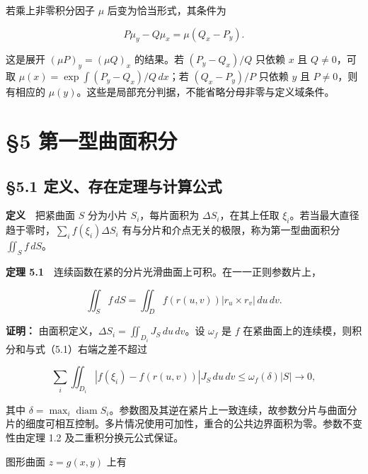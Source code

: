 \documentclass[11pt,a4paper]{article}
\begin{document}
若乘上非零积分因子 \(\mu\) 后变为恰当形式，其条件为

\begin{equation*}
 P\mu_y-Q\mu_x=\mu(Q_x-P_y).\tag{4.7}
\end{equation*}

这是展开 \((\mu P)_y=(\mu Q)_x\) 的结果。若 \((P_y-Q_x)/Q\) 只依赖 \(x\)
且 \(Q\ne0\)，可取 \(\mu(x)=\exp\int(P_y-Q_x)/Q\,dx\)；若
\((Q_x-P_y)/P\) 只依赖 \(y\) 且 \(P\ne0\)，则有相应的
\(\mu(y)\)。这些是局部充分判据，不能省略分母非零与定义域条件。

\section{§5
第一型曲面积分}\label{ux7b2cux4e00ux578bux66f2ux9762ux79efux5206}

\subsection{§5.1
定义、存在定理与计算公式}\label{ux5b9aux4e49ux5b58ux5728ux5b9aux7406ux4e0eux8ba1ux7b97ux516cux5f0f}

\textbf{定义}　把紧曲面 \(S\) 分为小片 \(S_i\)，每片面积为
\(\Delta S_i\)，在其上任取
\(\xi_i\)。若当最大直径趋于零时，\(\sum_if(\xi_i)\Delta S_i\)
有与分片和介点无关的极限，称为第一型曲面积分 \(\iint_Sf\,dS\)。

\textbf{定理
5.1}　连续函数在紧的分片光滑曲面上可积。在一一正则参数片上，

\begin{equation*}
 \iint_Sf\,dS=\iint_D f(r(u,v))|r_u\times r_v|\,du\,dv.\tag{5.1}
\end{equation*}

\textbf{证明：} 由面积定义，\(\Delta S_i=\iint_{D_i}J_S\,du\,dv\)。设
\(\omega_f\) 是 \(f\)
在紧曲面上的连续模，则积分和与式（5.1）右端之差不超过

\begin{equation*}
 \sum_i\iint_{D_i}|f(\xi_i)-f(r(u,v))|J_S\,du\,dv
 \le\omega_f(\delta)|S|\longrightarrow0,
\end{equation*}

其中
\(\delta=\max_i\operatorname{diam}S_i\)。参数图及其逆在紧片上一致连续，故参数分片与曲面分片的细度可相互控制。多片情况使用可加性，重合的公共边界面积为零。参数不变性由定理
1.2 及二重积分换元公式保证。

图形曲面 \(z=g(x,y)\) 上有
\end{document}
